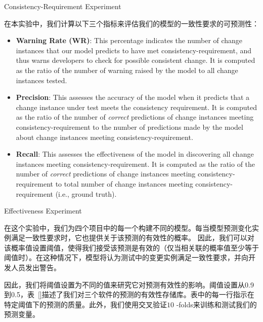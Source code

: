 {Consistency-Requirement Experiment}

在本实验中，我们计算以下三个指标来评估我们的模型的一致性要求的可预测性：
\begin{itemize}
\item \textbf{Warning Rate (WR)}: 
This percentage indicates the number of change instances that our model predicts to have met consistency-requirement, and thus warns developers to check for possible consistent change.
It is computed as the ratio of the number of warning raised by the model to all change instances tested. 

\item \textbf{Precision}: 
This assesses the accuracy of the model when it predicts that a change instance under test meets the consistency requirement. 
It is computed as the ratio of the number of {\em correct} predictions of change instances meeting consistency-requirement to the number of predictions made by the model about change instances meeting consistency-requirement.

\item \textbf{Recall}: 
This assesses the effectiveness of the model in discovering all change instances meeting consistency-requirement.
It is computed as the ratio of the number of {\em correct} predictions of change instances meeting consistency-requirement to total number of change instances meeting consistency-requirement (i.e., ground truth).
\end{itemize}

{Effectiveness Experiment}

在这个实验中，我们为四个项目中的每一个构建不同的模型。每当模型预测变化实例满足一致性要求时，它也提供关于该预测的有效性的概率。 因此，我们可以对该概率值设置阈值，使得我们接受该预测是有效的（仅当相关联的概率值至少等于阈值时）。在这种情况下，模型将认为测试中的变更实例满足一致性要求，并向开发人员发出警告。

因此，我们将阈值设置为不同的值来研究它对预测有效性的影响。阈值设置从0.9到0.5，表~\ref{}描述了我们对三个软件的预测的有效性存储库。表中的每一行指示在特定阈值下的预测的质量。此外，我们使用交叉验证$ 10 $ -folds来训练和测试我们的预测变量。

